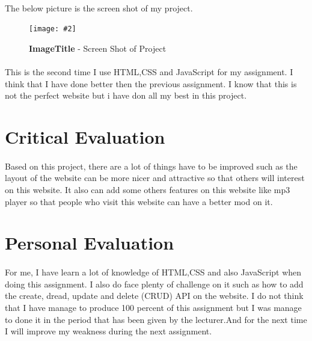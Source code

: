 \documentclass[10pt, a4paper]{article}
\newcommand{\figuremacro}[5]{
    \begin{figure}[#1]
        \centering
        \texttt{[image: \#2]}
        \caption[#3]{\textbf{#3}#4}
        \label{fig:#2}
    \end{figure}
}
\begin{document}
	\paragraph{}
	The below picture is the screen shot of my project.
	\figuremacro{h}{screenshot}{ImageTitle}{ - Screen Shot of Project }{1.0}
	\paragraph{}
	This is the second time I use HTML,CSS and JavaScript for my assignment. I think that I have done better then the previous assignment. I know that this is not the perfect website but i have don all my best in this project.
	\section{Critical Evaluation}
	\paragraph{}
	Based on this project, there are a lot of things have to be improved such as the layout of the website can be more nicer and attractive so that others will interest on this website. It also can add some others features on this website like mp3 player so that people who visit this website can have a better mod on it.
	
	\section{Personal Evaluation}
    \paragraph{}
     For me, I have learn a lot of knowledge of HTML,CSS and also JavaScript when doing this assignment. I also do face plenty of challenge on it such as how to add the create, dread, update and delete (CRUD) API on the website. I do not think that I have manage to produce 100 percent of this assignment but I was manage to done it in the period that has been given by the lecturer.And for the next time I will improve my weakness during the next assignment.
     
	
	
  
 
\end{document}
